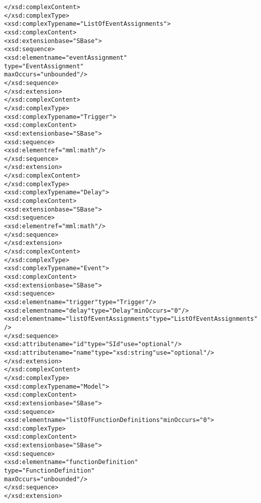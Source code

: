 \begin{alltt}
        </xsd:complexContent>
    </xsd:complexType>
    <xsd:complexType name="ListOfEventAssignments">
        <xsd:complexContent>
            <xsd:extension base="SBase">
                <xsd:sequence>
                    <xsd:element name="eventAssignment"
                                 type="EventAssignment" 
                                 maxOccurs="unbounded"/>
                </xsd:sequence>
            </xsd:extension>
        </xsd:complexContent>
    </xsd:complexType>
    <xsd:complexType name="Trigger">
        <xsd:complexContent>
            <xsd:extension base="SBase">
                <xsd:sequence>
                    <xsd:element ref="mml:math"/>
                </xsd:sequence>
            </xsd:extension>
        </xsd:complexContent>
    </xsd:complexType>
    <xsd:complexType name="Delay">
        <xsd:complexContent>
            <xsd:extension base="SBase">
                <xsd:sequence>
                    <xsd:element ref="mml:math"/>
                </xsd:sequence>
            </xsd:extension>
        </xsd:complexContent>
    </xsd:complexType>
    <xsd:complexType name="Event">
        <xsd:complexContent>
            <xsd:extension base="SBase">
                <xsd:sequence>
                    <xsd:element name="trigger" type="Trigger"/>
                    <xsd:element name="delay" type="Delay" minOccurs="0"/>
                    <xsd:element name="listOfEventAssignments" type="ListOfEventAssignments"/>
                </xsd:sequence>
                <xsd:attribute name="id" type="SId" use="optional"/>
                <xsd:attribute name="name" type="xsd:string" use="optional"/>
            </xsd:extension>
        </xsd:complexContent>
    </xsd:complexType>
    <xsd:complexType name="Model">
        <xsd:complexContent>
            <xsd:extension base="SBase">
                <xsd:sequence>
                    <xsd:element name="listOfFunctionDefinitions" minOccurs="0">
                        <xsd:complexType>
                            <xsd:complexContent>
                                <xsd:extension base="SBase">
                                    <xsd:sequence>
                                        <xsd:element name="functionDefinition" 
                                                     type="FunctionDefinition" 
                                                     maxOccurs="unbounded"/>
                                    </xsd:sequence>
                                </xsd:extension>

\end{alltt}
